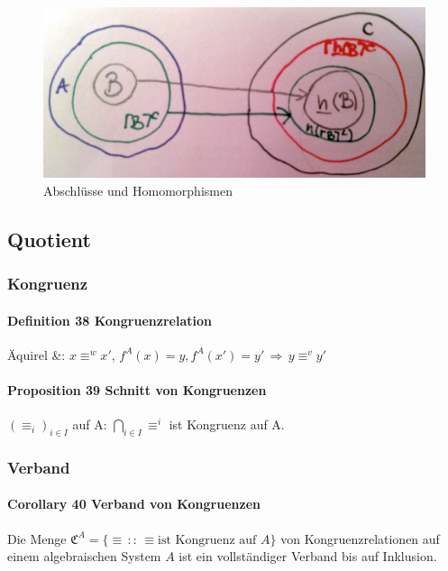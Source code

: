 \begin{figure}[h]
\noindent \centering{}\includegraphics[scale=0.14]{Abbildungen/37}\caption{Abschlüsse und Homomorphismen}
\end{figure}

\subsection{Quotient}

\subsubsection{Kongruenz}

\paragraph{Definition 38 Kongruenzrelation}
Äquirel \&: 
$
x\equiv^{w}x',\, f^{A}(x)=y, f^{A}(x')=y' \, \Rightarrow  \, y\equiv^{v}y'
$

\paragraph{Proposition 39 Schnitt von Kongruenzen}
$\left(\equiv_{i}\right)_{i\in I}$ auf A: $\bigcap_{i\in I}\equiv^{i}$ ist Kongruenz auf A.

\subsubsection{Verband}

\paragraph{Corollary 40 Verband von Kongruenzen}
Die Menge $\mathfrak{C}^{A}=\{\equiv\,::\,\equiv\textrm{ist Kongruenz auf }A\}$
von Kongruenzrelationen auf einem algebraischen System $A$ ist ein vollständiger Verband bis auf Inklusion.

